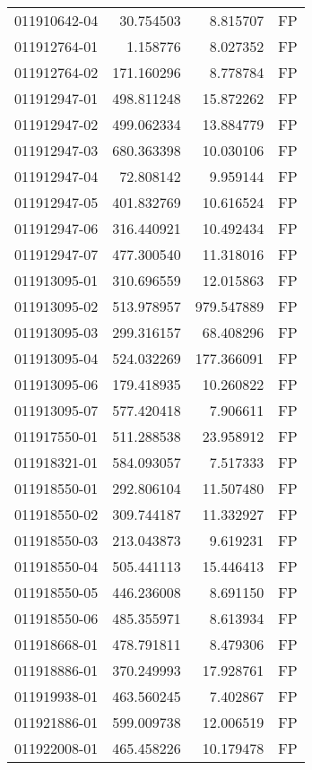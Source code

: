 \begin{tabular}{lrrl}
011910642-04 &   30.754503 &     8.815707 &   FP \\
011912764-01 &    1.158776 &     8.027352 &   FP \\
011912764-02 &  171.160296 &     8.778784 &   FP \\
011912947-01 &  498.811248 &    15.872262 &   FP \\
011912947-02 &  499.062334 &    13.884779 &   FP \\
011912947-03 &  680.363398 &    10.030106 &   FP \\
011912947-04 &   72.808142 &     9.959144 &   FP \\
011912947-05 &  401.832769 &    10.616524 &   FP \\
011912947-06 &  316.440921 &    10.492434 &   FP \\
011912947-07 &  477.300540 &    11.318016 &   FP \\
011913095-01 &  310.696559 &    12.015863 &   FP \\
011913095-02 &  513.978957 &   979.547889 &   FP \\
011913095-03 &  299.316157 &    68.408296 &   FP \\
011913095-04 &  524.032269 &   177.366091 &   FP \\
011913095-06 &  179.418935 &    10.260822 &   FP \\
011913095-07 &  577.420418 &     7.906611 &   FP \\
011917550-01 &  511.288538 &    23.958912 &   FP \\
011918321-01 &  584.093057 &     7.517333 &   FP \\
011918550-01 &  292.806104 &    11.507480 &   FP \\
011918550-02 &  309.744187 &    11.332927 &   FP \\
011918550-03 &  213.043873 &     9.619231 &   FP \\
011918550-04 &  505.441113 &    15.446413 &   FP \\
011918550-05 &  446.236008 &     8.691150 &   FP \\
011918550-06 &  485.355971 &     8.613934 &   FP \\
011918668-01 &  478.791811 &     8.479306 &   FP \\
011918886-01 &  370.249993 &    17.928761 &   FP \\
011919938-01 &  463.560245 &     7.402867 &   FP \\
011921886-01 &  599.009738 &    12.006519 &   FP \\
011922008-01 &  465.458226 &    10.179478 &   FP \\

\end{tabular}
